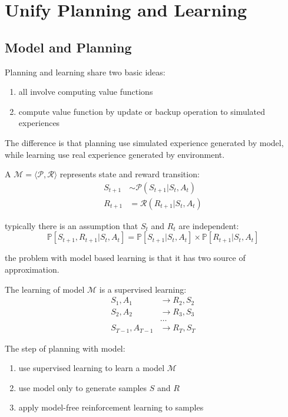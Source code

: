 \section{Unify Planning and Learning}

\subsection{Model and Planning}
Planning and learning share two basic ideas:

\begin{enumerate}
	\item all involve computing value functions
	\item compute value function by update or backup operation to simulated experiences
\end{enumerate}

The difference is that planning use simulated experience generated by model, while learning use real experience generated by environment.

A  $\mathcal{M} = \langle \mathcal{P}, \mathcal{R} \rangle$ represents state and reward transition:
\begin{equation}
	\begin{aligned}
		S_{t+1} &\sim \mathcal{P}(S_{t+1}|S_t,A_t) \\
		R_{t+1} &= \mathcal{R}(R_{t+1}|S_t,A_t)
	\end{aligned}
\end{equation}

typically there is an assumption that $S_{t}$ and $R_t$ are independent:
\begin{equation}
	\mathbb{P}[S_{t+1},R_{t+1}|S_t,A_t] = \mathbb{P}[S_{t+1} |S_t,A_t] \times \mathbb{P}[ R_{t+1}|S_t,A_t]
\end{equation}

the problem with model based learning is that it has two source of approximation.


The learning of model $\mathcal{M}$ is a supervised learning:
\begin{equation}
	\begin{aligned}
		S_1, A_1 &\rightarrow R_2, S_2\\
		S_2, A_2 &\rightarrow R_3, S_3\\
		&\dots \\
		S_{T-1}, A_{T-1} &\rightarrow R_T, S_T
	\end{aligned}
\end{equation}

The step of planning with model:
\begin{enumerate}
	\item use supervised learning to learn a model $\mathcal{M}$
	\item use model only to generate samples $S$ and $R$
	\item apply model-free reinforcement learning to samples
\end{enumerate}

